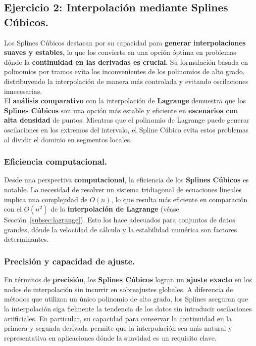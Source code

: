 \documentclass{article}
\begin{document}
\subsection{Ejercicio 2: Interpolación mediante Splines Cúbicos.}
\label{subsec:dsplines}
Los Splines Cúbicos destacan por su capacidad para \textbf{generar interpolaciones suaves y estables}, lo que los convierte en una opción óptima en problemas dónde la \textbf{continuidad en las derivadas es crucial}. Su formulación basada en polinomios por tramos evita los inconvenientes de los polinomios de alto grado, distribuyendo la interpolación de manera más controlada y evitando oscilaciones innecesarias.\\

El \textbf{análisis comparativo} con la interpolación de \textbf{Lagrange} demuestra que los \textbf{Splines Cúbicos} son una opción más estable y eficiente en \textbf{escenarios con alta densidad} de puntos. Mientras que el polinomio de Lagrange puede generar oscilaciones en los extremos del intervalo, el Spline Cúbico evita estos problemas al dividir el dominio en segmentos locales.

\subsubsection*{Eficiencia computacional.}
Desde una perspectiva \textbf{computacional}, la eficiencia de los \textbf{Splines Cúbicos} es notable. La necesidad de resolver un sistema tridiagonal de ecuaciones lineales implica una complejidad de $O(n)$, lo que resulta más eficiente en comparación con el $O(n^2)$ de la \textbf{interpolación de Lagrange} (véase Sección~\ref{subsec:lagrange}). Esto los hace adecuados para conjuntos de datos grandes, dónde la velocidad de cálculo y la estabilidad numérica son factores determinantes.

\subsubsection*{Precisión y capacidad de ajuste.}
En términos de \textbf{precisión}, los \textbf{Splines Cúbicos} logran un \textbf{ajuste exacto} en los nodos de interpolación sin incurrir en sobreajustes globales. A diferencia de métodos que utilizan un único polinomio de alto grado, los Splines aseguran que la interpolación siga fielmente la tendencia de los datos sin introducir oscilaciones artificiales. En particular, su capacidad para conservar la continuidad en la primera y segunda derivada permite que la interpolación sea más natural y representativa en aplicaciones dónde la suavidad es un requisito clave.
\end{document}

